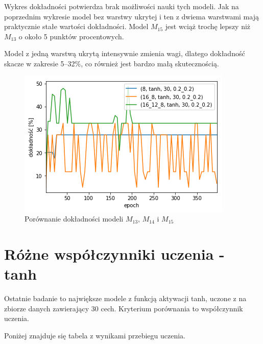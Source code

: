 \documentclass{report}
\begin{document}
    Wykres dokładności potwierdza brak możliwości nauki tych modeli.
    Jak na poprzednim wykresie model bez warstwy ukrytej i ten z dwiema warstwami mają praktycznie stałe wartości dokładności.
    Model $M_{15}$ jest wciąż trochę lepszy niż $M_{13}$ o około 5 punktów procentowych.

    Model z jedną warstwą ukrytą intensywnie zmienia wagi, dlatego dokładność skacze w zakresie 5--32\%, co również jest bardzo małą skutecznością.

    \begin{figure}[htp]
        \centering
        \includegraphics[scale=0.8]{././img/arch-accuracy-tanh.png}
        \caption{Porównanie dokładności modeli $M_{13}$, $M_{14}$ i $M_{15}$}
    \end{figure}

    \section{Różne współczynniki uczenia - tanh}\label{sec:rozneWspolczynnikiUczenia-Tanh}


    Ostatnie badanie to największe modele z funkcją aktywacji tanh, uczone z na zbiorze danych zawierający 30 cech.
    Kryterium porównania to współczynnik uczenia.

    Poniżej znajduje się tabela z wynikami przebiegu uczenia.
\end{document}
